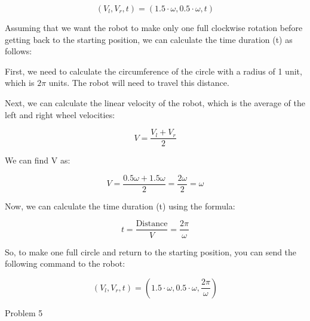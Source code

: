 \documentclass[answers]{exam}
\begin{document}
\begin{questions}
\begin{parts}
\begin{solution}
            \[(V_l, V_r, t) = (1.5\cdot\omega, 0.5\cdot\omega, t)\]

            Assuming that we want the robot to make only one full clockwise rotation before getting back to the starting position, we can calculate the time duration (t) as follows:

            First, we need to calculate the circumference of the circle with a radius of 1 unit, which is \(2\pi\) units. The robot will need to travel this distance.

            Next, we can calculate the linear velocity of the robot, which is the average of the left and right wheel velocities:

            \[V = \frac{V_l + V_r}{2}\]

            We can find V as:

            \[V = \frac{0.5\omega + 1.5\omega}{2} = \frac{2\omega}{2} = \omega\]

            Now, we can calculate the time duration (t) using the formula:

            \[t = \frac{\text{Distance}}{V} = \frac{2\pi}{\omega}\]

            So, to make one full circle and return to the starting position, you can send the following command to the robot:

            \[(V_l, V_r, t) = (1.5\cdot\omega, 0.5\cdot\omega, \frac{2\pi}{\omega})\]

        \end{solution}
    \end{parts}
    \question Problem 5

\end{questions}
\end{document}
